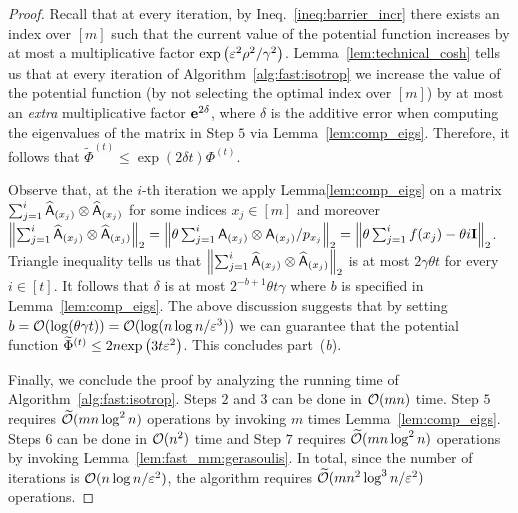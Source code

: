 \begin{proof}
%
Recall that at every iteration, by Ineq.~\eqref{ineq:barrier_incr} there exists an index over $[m]$ such that the current value of the potential function increases by at most a multiplicative factor $\hbox{\textrm exp}\left( \varepsilon^2 \rho^2 / \gamma^2\right)$. Lemma~\ref{lem:technical_cosh} tells us that at every iteration of Algorithm~\ref{alg:fast:isotrop} we increase the value of the potential function (by not selecting the optimal index over $[m]$) by at most an \emph{extra} multiplicative factor ${\mathbf e}^{2\delta}$, where $\delta$ is the additive error when computing the eigenvalues of the matrix in Step $5$ via Lemma~\ref{lem:comp_eigs}. Therefore, it follows that $\widetilde{\Phi}^{(t)} \leq \exp( 2\delta t) \Phi^{(t)}.$
%

%
Observe that, at the $i$-th iteration we apply Lemma\ref{lem:comp_eigs} on a matrix $\sum_{j=1}^{i} \widehat{{\mathsf{A} }}_{(x_j)} \otimes \widehat{{\mathsf{A} }}_{(x_j)}$ for some indices $x_j\in{[m]}$ and moreover $\left\|\sum_{j=1}^{i}{ \widehat{{\mathsf{A} }}_{(x_j)} \otimes \widehat{{\mathsf{A} }}_{(x_j)}} \right\|_2 =  \left\| \theta \sum_{j=1}^{i}{ {\mathsf{A} }_{(x_j)} \otimes {\ensuremath{\mathsf{A} }}_{(x_j)} / p_{x_j} } \right\|_2 =   \left\|\theta \sum_{j=1}^{i} f(x_j ) - \theta i \mathbf{I}\right\|_2$. Triangle inequality tells us that $\left\| \sum_{j=1}^{i}{ \widehat{{\mathsf{A} }}_{(x_j)} \otimes \widehat{{\mathsf{A} }}_{(x_j)}} \right\|_2$ is at most $2\gamma\theta t$ for every $i \in{[t]}$. It follows that $\delta$ is at most $2^{-b+1} \theta t \gamma$ where $b$ is specified in Lemma~\ref{lem:comp_eigs}. The above discussion suggests that by setting $b= \mathcal{O}(\log( \theta \gamma t))=\mathcal{O}(\log (n\log n /\varepsilon^3))$ we can guarantee that the potential function $\widetilde{\Phi}^{(t)} \leq  2n \hbox{\textrm exp}\left( 3t \varepsilon^2 \right)$. This concludes part~(\emph{b}).
%

%
Finally, we conclude the proof by analyzing the running time of Algorithm~\ref{alg:fast:isotrop}. Steps $2$ and $3$ can be done in $\mathcal{O}(mn)$ time. Step $5$ requires $\widetilde{\mathcal{O}}(mn\log^2 n )$ operations by invoking $m$ times Lemma~\ref{lem:comp_eigs}. Steps $6$ can be done in $\mathcal{O}(n^2)$ time and Step $7$ requires $\widetilde{\mathcal{O}}(mn\log^2 n )$ operations by invoking Lemma~\ref{lem:fast_mm:gerasoulis}. In total, since the number of iterations is $\mathcal{O}(n\log n /\varepsilon^2)$, the algorithm requires $\widetilde{\mathcal{O}}( mn^2 \log^3 n /\varepsilon^2)$ operations.
\end{proof}
%
%
%
%
